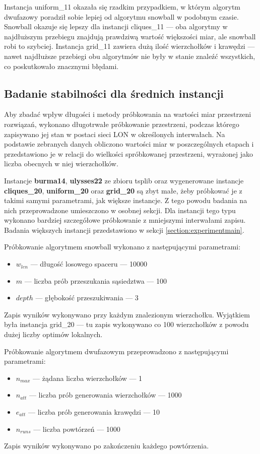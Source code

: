 Instancja uniform\_11 okazała się rzadkim przypadkiem, w którym algorytm dwufazowy poradził sobie lepiej od algorytmu snowball w podobnym czasie.
Snowball okazuje się lepszy dla instancji cliques\_11 --- oba algorytmy w najdłuższym przebiegu znajdują prawdziwą wartość większości miar, ale snowball robi to szybciej.
Instancja grid\_11 zawiera dużą ilość wierzchołków i krawędzi --- nawet najdłuższe przebiegi obu algorytmów nie były w stanie znaleźć wszystkich,
co poskutkowało znacznymi błędami.

\subsection{Badanie stabilności dla średnich instancji} \label{section:experimentsmall}
Aby zbadać wpływ długości i metody próbkowania na wartości miar przestrzeni rozwiązań,
wykonano długotrwałe próbkowanie przestrzeni, podczas którego zapisywano jej stan w postaci sieci LON w określonych interwałach.
Na podstawie zebranych danych obliczono wartości miar w poszczególnych etapach i przedstawiono je w relacji do wielkości spróbkowanej przestrzeni,
wyrażonej jako liczba obecnych w niej wierzchołków.

Instancje \textbf{burma14}, \textbf{ulysses22} ze zbioru tsplib oraz wygenerowane instancje
\textbf{cliques\_20}, \textbf{uniform\_20} oraz \textbf{grid\_20}
są zbyt małe, żeby próbkować je z takimi samymi parametrami, jak większe instancje.
Z tego powodu badania na nich przeprowadzone umieszczono w osobnej sekcji.
Dla instancji tego typu wykonano bardziej szczegółowe próbkowanie z mniejszymi interwałami zapisu.
Badania większych instancji przedstawiono w sekcji \ref{section:experimentmain}.

Próbkowanie algorytmem snowball wykonano z następującymi parametrami:
\begin{itemize}
    \item $w_{len}$ --- długość losowego spaceru --- 10000
    \item $m$ --- liczba prób przeszukania sąsiedztwa --- 100
    \item $depth$ --- głębokość przeszukiwania --- 3
\end{itemize}
Zapis wyników wykonywano przy każdym znalezionym wierzchołku.
Wyjątkiem była instancja grid\_20 --- tu zapis wykonywano co 100 wierzchołków z powodu dużej liczby optimów lokalnych.

Próbkowanie algorytmem dwufazowym przeprowadzono z następującymi parametrami:
\begin{itemize}
    \item $n_{max}$ --- żądana liczba wierzchołków --- 1
    \item $n_{att}$ --- liczba prób generowania wierzchołków --- 1000
    \item $e_{att}$ --- liczba prób generowania krawędzi --- 10
    \item $n_{runs}$ --- liczba powtórzeń --- 1000
\end{itemize}
Zapis wyników wykonywano po zakończeniu każdego powtórzenia.

